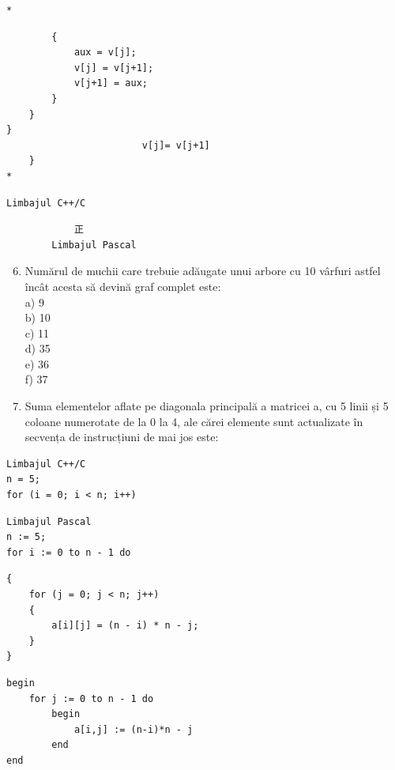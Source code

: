 \documentclass[10pt]{article}
\begin{document}
\begin{verbatim}
*
\end{verbatim}

\begin{verbatim}
        {
            aux = v[j];
            v[j] = v[j+1];
            v[j+1] = aux;
        }
    }
}
                        v[j]= v[j+1]
    }
*
\end{verbatim}

\begin{verbatim}
Limbajul C++/C
\end{verbatim}

\begin{verbatim}
            正
        Limbajul Pascal
\end{verbatim}

\begin{enumerate}
  \setcounter{enumi}{5}
  \item Numărul de muchii care trebuie adăugate unui arbore cu 10 vârfuri astfel încât acesta să devină graf complet este:\\
a) 9\\
b) 10\\
c) 11\\
d) 35\\
e) 36\\
f) 37
  \item Suma elementelor aflate pe diagonala principală a matricei a, cu 5 linii și 5 coloane numerotate de la 0 la 4, ale cărei elemente sunt actualizate în secvența de instrucțiuni de mai jos este:
\end{enumerate}

\begin{verbatim}
Limbajul C++/C
n = 5;
for (i = 0; i < n; i++)
\end{verbatim}

\begin{verbatim}
Limbajul Pascal
n := 5;
for i := 0 to n - 1 do
\end{verbatim}

\begin{verbatim}
{
    for (j = 0; j < n; j++)
    {
        a[i][j] = (n - i) * n - j;
    }
}
\end{verbatim}

\begin{verbatim}
begin
    for j := 0 to n - 1 do
        begin
            a[i,j] := (n-i)*n - j
        end
end
\end{verbatim}
\end{document}
